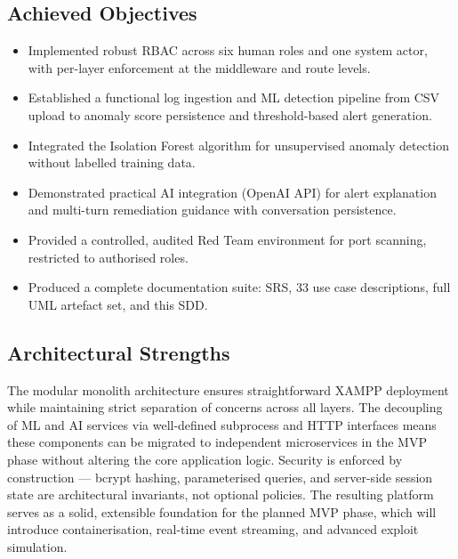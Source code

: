 \documentclass[12pt,a4paper]{article}
\begin{document}
\subsection{Achieved Objectives}
\begin{itemize}[leftmargin=*,itemsep=2pt]
  \item Implemented robust RBAC across six human roles and one system actor, with
    per-layer enforcement at the middleware and route levels.
  \item Established a functional log ingestion and ML detection pipeline from CSV upload
    to anomaly score persistence and threshold-based alert generation.
  \item Integrated the Isolation Forest algorithm for unsupervised anomaly detection
    without labelled training data.
  \item Demonstrated practical AI integration (OpenAI API) for alert explanation and
    multi-turn remediation guidance with conversation persistence.
  \item Provided a controlled, audited Red Team environment for port scanning, restricted
    to authorised roles.
  \item Produced a complete documentation suite: SRS, 33 use case descriptions,
    full UML artefact set, and this SDD.
\end{itemize}

\subsection{Architectural Strengths}
The modular monolith architecture ensures straightforward XAMPP deployment while
maintaining strict separation of concerns across all layers. The decoupling of ML
and AI services via well-defined subprocess and HTTP interfaces means these components
can be migrated to independent microservices in the MVP phase without altering the
core application logic. Security is enforced by construction --- bcrypt hashing,
parameterised queries, and server-side session state are architectural invariants,
not optional policies. The resulting platform serves as a solid, extensible foundation
for the planned MVP phase, which will introduce containerisation, real-time event
streaming, and advanced exploit simulation.
\end{document}
